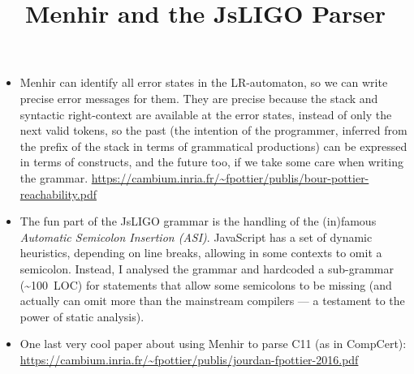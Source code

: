\documentclass[wide]{slides}
\newcommand{\JsLIGO}[0]{\textsf{JsLIGO}}
\newcommand{\Menhir}[0]{\textsf{Menhir}}
\begin{document}
\begin{slide}
  \title{Menhir and the JsLIGO Parser}

  \begin{itemize}

    \item \Menhir{} can identify all error states in the
      LR\hyp{}automaton, so we can write precise error messages for
      them. They are precise because the stack and syntactic
      right\hyp{}context are available at the error states, instead of
      only the next valid tokens, so the past (the intention of the
      programmer, inferred from the prefix of the stack in terms of
      grammatical productions) can be expressed in terms of
      constructs, and the future too, if we take some care when
      writing the
      grammar. \url{https://cambium.inria.fr/~fpottier/publis/bour-pottier-reachability.pdf}

    \item The fun part of the \JsLIGO{} grammar is the handling of the
      (in)famous \emph{Automatic Semicolon Insertion
    (ASI)}. JavaScript has a set of dynamic heuristics, depending on
      line breaks, allowing in some contexts to omit a
      semicolon. Instead, I analysed the grammar and hardcoded a
      sub\hyp{}grammar (\~{}100~LOC) for statements that allow some
      semicolons to be missing (and actually can omit more than the
      mainstream compilers --- a testament to the power of static
      analysis).

    \item One last very cool paper about using \Menhir{} to
      parse C11 (as in \textsf{CompCert}):
      \url{https://cambium.inria.fr/~fpottier/publis/jourdan-fpottier-2016.pdf}
  \end{itemize}
\end{slide}
\end{document}
